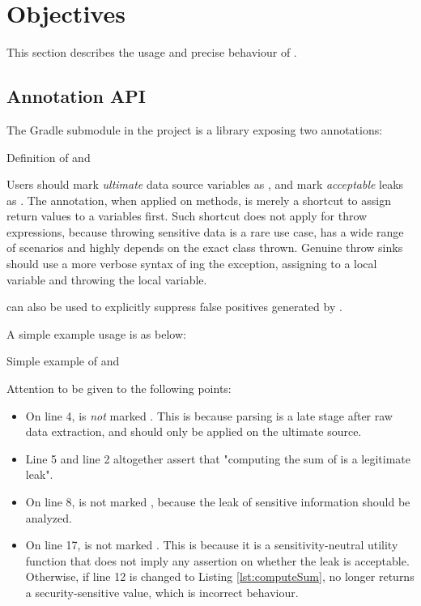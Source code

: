 \section{Objectives}
This section describes the usage and precise behaviour of \pname{}.

\subsection{Annotation API}
The  Gradle submodule in the project
is a  library exposing two annotations:

{Definition of  and }

Users should mark \emph{ultimate} data source variables as ,
and mark \emph{acceptable} leaks as .
The  annotation, when applied on methods,
is merely a shortcut to assign return values to a  variables first.
Such shortcut does not apply for throw expressions,
because throwing sensitive data is a rare use case,
has a wide range of scenarios
and highly depends on the exact class thrown.
Genuine throw sinks should use a more verbose syntax of ing the exception,
assigning to a local  variable and throwing the local variable.

 can also be used to explicitly suppress false positives generated by \pname{}.

A simple example usage is as below:

{Simple example of  and }

Attention to be given to the following points:
\begin{itemize}
	\item On line 4,  is \emph{not} marked .
		This is because parsing is a late stage after raw data extraction,
		and  should only be applied on the ultimate source.
	\item Line 5 and line 2 altogether assert that
		"computing the sum of  is a legitimate leak".
	\item On line 8,  is not marked ,
		because the leak of sensitive information should be analyzed.
	\item On line 17,  is not marked .
		This is because it is a sensitivity-neutral utility function
		that does not imply any assertion on whether the leak is acceptable.
		Otherwise, if line 12 is changed to Listing \ref{lst:computeSum},
		 no longer returns a security-sensitive value,
		which is incorrect behaviour.
\end{itemize}

